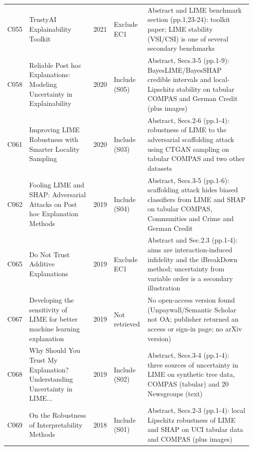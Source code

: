 \begin{longtable}{@{}P{1.0cm}P{6.3cm}P{0.7cm}P{1.6cm}P{6.1cm}@{}}
C055 & TrustyAI Explainability Toolkit & 2021 & Exclude EC1 & Abstract and LIME benchmark section (pp.1,23-24): toolkit paper; LIME stability (VSI/\allowbreak{}CSI) is one of several secondary benchmarks \\
C058 & Reliable Post hoc Explanations: Modeling Uncertainty in Explainability & 2020 & Include (S05) & Abstract, Secs.3-5 (pp.1-9): BayesLIME/\allowbreak{}BayesSHAP credible intervals and local-Lipschitz stability on tabular COMPAS and German Credit (plus images) \\
C061 & Improving LIME Robustness with Smarter Locality Sampling & 2020 & Include (S03) & Abstract, Secs.2-6 (pp.1-4): robustness of LIME to the adversarial scaffolding attack using CTGAN sampling on tabular COMPAS and two other datasets \\
C062 & Fooling LIME and SHAP: Adversarial Attacks on Post hoc Explanation Methods & 2019 & Include (S04) & Abstract, Secs.3-5 (pp.1-6): scaffolding attack hides biased classifiers from LIME and SHAP on tabular COMPAS, Communities and Crime and German Credit \\
C065 & Do Not Trust Additive Explanations & 2019 & Exclude EC1 & Abstract and Sec.2.3 (pp.1-4): aims are interaction-induced infidelity and the iBreakDown method; uncertainty from variable order is a secondary illustration \\
C067 & Developing the sensitivity of LIME for better machine learning explanation & 2019 & Not retrieved & No open-access version found (Unpaywall/\allowbreak{}Semantic Scholar not OA; publisher returned an access or sign-in page; no arXiv version) \\
C068 & \textquotedbl{}Why Should You Trust My Explanation?\textquotedbl{} Understanding Uncertainty in LIME... & 2019 & Include (S02) & Abstract, Secs.3-4 (pp.1-4): three sources of uncertainty in LIME on synthetic tree data, COMPAS (tabular) and 20 Newsgroups (text) \\
C069 & On the Robustness of Interpretability Methods & 2018 & Include (S01) & Abstract, Secs.2-3 (pp.1-4): local Lipschitz robustness of LIME and SHAP on UCI tabular data and COMPAS (plus images) \\
\end{longtable}
